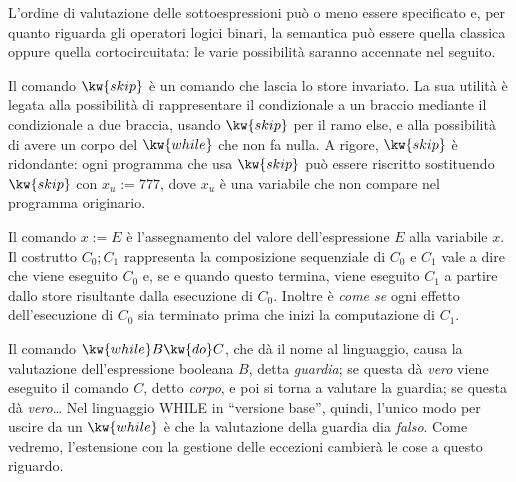 L'ordine di valutazione delle sottoespressioni può o meno essere specificato
e, per quanto riguarda gli operatori logici binari, la semantica può essere
quella classica oppure quella cortocircuitata: le varie possibilità
saranno accennate nel seguito.

Il comando $\kw{skip}$ è un comando che lascia lo store invariato.
La sua utilità è legata alla possibilità di rappresentare il condizionale
a un braccio mediante il condizionale a due braccia, usando $\kw{skip}$ per
il ramo else, e alla possibilità di avere un corpo del $\kw{while}$ che
non fa nulla.  A rigore, $\kw{skip}$ è ridondante: ogni programma
che usa $\kw{skip}$ può essere riscritto sostituendo $\kw{skip}$
con $x_u := 777$, dove $x_u$ è una variabile che non compare nel
programma originario.

Il comando $x := E$ è l'assegnamento del valore dell'espressione $E$
alla variabile $x$.  Il costrutto $C_0; C_1$ rappresenta la composizione
sequenziale di $C_0$ e $C_1$ vale a dire che viene eseguito $C_0$ e,
se e quando questo termina, viene eseguito $C_1$ a partire dallo store
risultante dalla esecuzione di $C_0$.  Inoltre è \emph{come se} ogni
effetto dell'esecuzione di $C_0$ sia terminato prima che inizi la
computazione di $C_1$.

Il comando $\kw{while} B \kw{do} C$, che dà il nome al linguaggio,
causa la valutazione dell'espressione booleana $B$, detta \emph{guardia};
se questa dà \emph{vero} viene eseguito il comando $C$, detto \emph{corpo},
e poi si torna a valutare la guardia; se questa dà \emph{vero}\dots
Nel linguaggio WHILE in ``versione base'', quindi, l'unico modo per
uscire da un $\kw{while}$ è che la valutazione della guardia dia \emph{falso}.
Come vedremo, l'estensione con la gestione delle eccezioni cambierà le cose
a questo riguardo.


